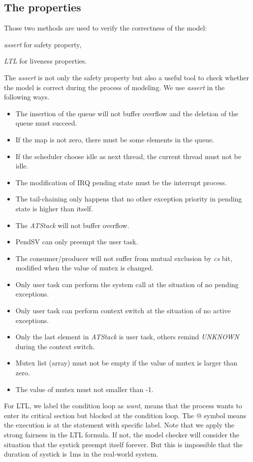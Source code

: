 \subsection{The properties} Those two methods are used to verify the correctness of the model:
\begin{enumerate*}[label={\roman*)},font={\bfseries}]
\item \textit{assert} for safety property,
\item \textit{LTL} for liveness properties.
\end{enumerate*}
The \textit{assert} is not only the safety property but also a useful tool to check whether the model is correct during the process of modeling. We use \textit{assert} in the following ways.
\begin{itemize}
\item The insertion of the queue will not buffer overflow and the deletion of the queue must succeed.
\item If the map is not zero, there must be some elements in the queue.
\item If the scheduler choose idle as next thread, the current thread must not be idle.
\item The modification of IRQ pending state must be the interrupt process.
\item The tail-chaining only happens that no other exception priority in pending state is higher than itself.
\item The \textit{ATStack} will not buffer overflow.
\item PendSV can only preempt the user task.
\item The consumer/producer will not suffer from mutual exclusion by \textit{cs} bit, modified when the value of mutex is changed.
\item Only user task can perform the system call at the situation of no pending exceptions.
\item Only user task can perform context switch at the situation of no active exceptions.
\item Only the last element in \textit{ATStack} is user task, others remind \textit{UNKNOWN} during the context switch.
\item Mutex list (array) must not be empty if the value of mutex is larger than zero.
\item The value of mutex must not smaller than -1.
\end{itemize}
For LTL, we label the condition loop as \textit{want}, means that the process wants to enter its critical section but blocked at the condition loop. The $@$ symbol means the execution is at the statement with specific label. Note that we apply the strong fairness in the LTL formula. If not, the model checker will consider the situation that the systick preempt itself forever. But this is impossible that the duration of systick is 1ms in the real-world system.

